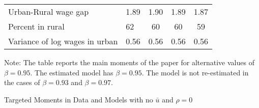 \documentclass[12pt,pdftex]{article}
\renewcommand{\arraystretch}{1.1}
\begin{document}
\begin{onehalfspacing}
\begin{table}[!htb]
\begin{center}
\begin{tabular}{l l c c c}
\hline
Urban-Rural wage gap & 1.89  & 1.90  & 1.89 &  1.87  \\
Percent in rural & \phantom{0.}62 & \phantom{0.}60 & \phantom{0.}60 & \phantom{0.}59   \\
Variance of log wages in urban & 0.56 &  0.56 &  0.56 &   0.56       \\
\hline
\hline
\end{tabular}
\parbox[c]{6.5in}{%
{\footnotesize  \vspace{0.3cm} Note: The table reports the main moments of the paper for alternative values of $\beta=0.95$. The estimated model has $\beta=0.95$. The model is not re-estimated in the cases of $\beta=0.93$ and $\beta=0.97.$}
}
\end{center}
\end{table}

\newpage

\begin{table}[!htb]
\small
\setlength {\tabcolsep}{2mm}
\renewcommand{\arraystretch}{1.2}
\begin{center}
\caption{Targeted Moments in Data and Models with no $\bar{u}$ and $\rho=0$}

\vspace{0.3cm}


\end{center}
\end{table}
\end{onehalfspacing}
\end{document}
